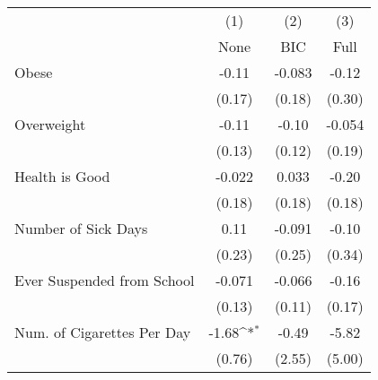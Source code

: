 {
\def\sym#1{\ifmmode^{#1}\else\(^{#1}\)\fi}
\begin{tabular}{l*{3}{c}}
\toprule
            &\multicolumn{1}{c}{(1)}&\multicolumn{1}{c}{(2)}&\multicolumn{1}{c}{(3)}\\
            &\multicolumn{1}{c}{None}&\multicolumn{1}{c}{BIC}&\multicolumn{1}{c}{Full}\\
\midrule
Obese       &       -0.11         &      -0.083         &       -0.12         \\
            &      (0.17)         &      (0.18)         &      (0.30)         \\
\addlinespace
Overweight  &       -0.11         &       -0.10         &      -0.054         \\
            &      (0.13)         &      (0.12)         &      (0.19)         \\
\addlinespace
Health is Good&      -0.022         &       0.033         &       -0.20         \\
            &      (0.18)         &      (0.18)         &      (0.18)         \\
\addlinespace
Number of Sick Days&        0.11         &      -0.091         &       -0.10         \\
            &      (0.23)         &      (0.25)         &      (0.34)         \\
\addlinespace
Ever Suspended from School&      -0.071         &      -0.066         &       -0.16         \\
            &      (0.13)         &      (0.11)         &      (0.17)         \\
\addlinespace
Num. of Cigarettes Per Day&       -1.68\sym{*}  &       -0.49         &       -5.82         \\
            &      (0.76)         &      (2.55)         &      (5.00)         \\
\bottomrule
\end{tabular}
}

